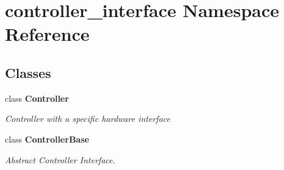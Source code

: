 \section{controller\-\_\-interface \-Namespace \-Reference}
\label{namespacecontroller__interface}
\subsection*{\-Classes}
\begin{DoxyCompactItemize}
\item 
class {\bf \-Controller}
\begin{DoxyCompactList}\small\item\em \-Controller with a specific hardware interface \end{DoxyCompactList}\item 
class {\bf \-Controller\-Base}
\begin{DoxyCompactList}\small\item\em \-Abstract \-Controller \-Interface. \end{DoxyCompactList}\end{DoxyCompactItemize}
